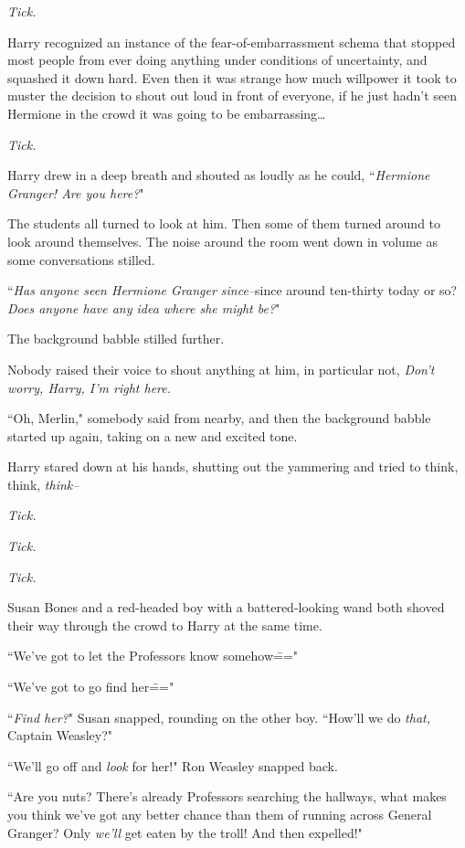 \emph{Tick.}

Harry recognized an instance of the fear-of-embarrassment schema that stopped most people from ever doing anything under conditions of uncertainty, and squashed it down hard. Even then it was strange how much willpower it took to muster the decision to shout out loud in front of everyone, if he just hadn't seen Hermione in the crowd it was going to be embarrassing{\ldots}

\emph{Tick.}

Harry drew in a deep breath and shouted as loudly as he could, ``\emph{Hermione Granger! Are you here?}"

The students all turned to look at him. Then some of them turned around to look around themselves. The noise around the room went down in volume as some conversations stilled.

``\emph{Has anyone seen Hermione Granger since\---}since around ten-thirty today or so? \emph{Does anyone have any idea where she might be?}"

The background babble stilled further.

Nobody raised their voice to shout anything at him, in particular not, \emph{Don't worry, Harry, I'm right here.}

``Oh, Merlin," somebody said from nearby, and then the background babble started up again, taking on a new and excited tone.

Harry stared down at his hands, shutting out the yammering and tried to think, think, \emph{think\---}

\emph{Tick.}

\emph{Tick.}

\emph{Tick.}

Susan Bones and a red-headed boy with a battered-looking wand both shoved their way through the crowd to Harry at the same time.

``We've got to let the Professors know somehow\==="

``We've got to go find her\==="

``\emph{Find her?}" Susan snapped, rounding on the other boy. ``How'll we do \emph{that,} Captain Weasley?"

``We'll go off and \emph{look} for her!" Ron Weasley snapped back.

``Are you nuts? There's already Professors searching the hallways, what makes you think we've got any better chance than them of running across General Granger? Only \emph{we'll} get eaten by the troll! And then expelled!"

